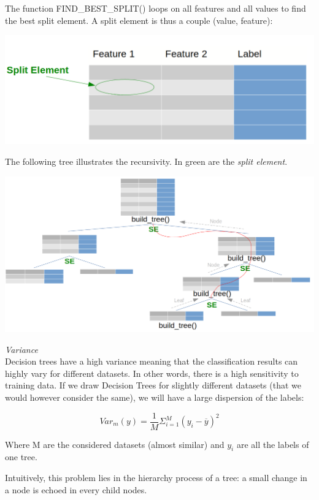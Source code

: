The function FIND\_BEST\_SPLIT() loops on all features and all values to find the best split element. A split element is thus a couple (value, feature):

\begin{center}
\includegraphics[scale=0.2]{trees_split_element.png}
\end{center}

The following tree illustrates the recursivity. In green are the \textit{split element}.

\begin{center}
\includegraphics[scale=0.3]{trees_recursivity.png}
\end{center}

\textit{Variance} \\

Decision trees have a high variance meaning that the classification results can highly vary for different datasets. In other words, there is a high sensitivity to training data. If we draw Decision Trees for slightly different datasets (that we would however consider the same), we will have a large dispersion of the labels:

$$Var_m(y) = \frac{1}{M}\Sigma_{i=1}^M(y_i - \overline{y})^2$$

Where M are the considered datasets (almost similar) and $y_i$ are all the labels of one tree.

Intuitively, this problem lies in the hierarchy process of a tree: a small change in a node is echoed in every child nodes.

\vspace{5mm}